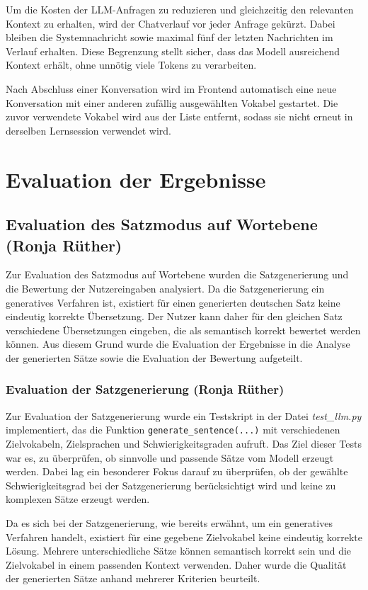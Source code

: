 Um die Kosten der LLM-Anfragen zu reduzieren und gleichzeitig den relevanten Kontext zu erhalten, wird der Chatverlauf vor jeder Anfrage gekürzt. 
Dabei bleiben die Systemnachricht sowie maximal fünf der letzten Nachrichten im Verlauf erhalten. 
Diese Begrenzung stellt sicher, dass das Modell ausreichend Kontext erhält, ohne unnötig viele Tokens zu verarbeiten.

Nach Abschluss einer Konversation wird im Frontend automatisch eine neue Konversation mit einer anderen zufällig ausgewählten Vokabel gestartet. 
Die zuvor verwendete Vokabel wird aus der Liste entfernt, sodass sie nicht erneut in derselben Lernsession verwendet wird.

\section{Evaluation der Ergebnisse}

\subsection{Evaluation des Satzmodus auf Wortebene (Ronja Rüther)}
Zur Evaluation des Satzmodus auf Wortebene wurden die Satzgenerierung und die Bewertung der Nutzereingaben analysiert.
Da die Satzgenerierung ein generatives Verfahren ist, existiert für einen generierten deutschen Satz keine eindeutig korrekte Übersetzung.
Der Nutzer kann daher für den gleichen Satz verschiedene Übersetzungen eingeben, die als semantisch korrekt bewertet werden können. Aus diesem Grund 
wurde die Evaluation der Ergebnisse in die Analyse der generierten Sätze sowie die Evaluation der Bewertung aufgeteilt.

\subsubsection{Evaluation der Satzgenerierung (Ronja Rüther)}
Zur Evaluation der Satzgenerierung wurde ein Testskript in der Datei \textit{test\_llm.py} implementiert, das die Funktion \texttt{generate\_sentence(...)}
mit verschiedenen Zielvokabeln, Zielsprachen und Schwierigkeitsgraden aufruft. 
Das Ziel dieser Tests war es, zu überprüfen, ob sinnvolle und passende Sätze vom Modell erzeugt werden.
Dabei lag ein besonderer Fokus darauf zu überprüfen, ob der gewählte Schwierigkeitsgrad bei der Satzgenerierung berücksichtigt wird und keine zu komplexen Sätze erzeugt werden.

Da es sich bei der Satzgenerierung, wie bereits erwähnt, um ein generatives Verfahren handelt, existiert für eine gegebene Zielvokabel keine eindeutig korrekte Lösung.
Mehrere unterschiedliche Sätze können semantisch korrekt sein und die Zielvokabel in einem passenden Kontext verwenden.
Daher wurde die Qualität der generierten Sätze anhand mehrerer Kriterien beurteilt.

